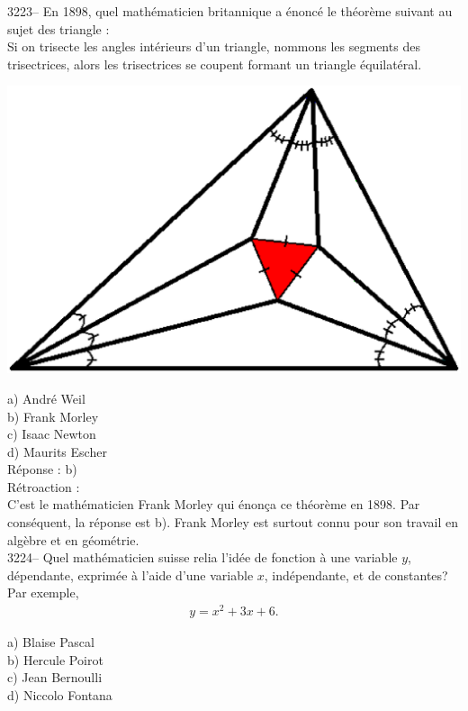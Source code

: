 \documentclass[letterpaper, 12pt]{article}
\begin{document}
3223-- En 1898, quel math\'ematicien britannique a \'enonc\'e le th\'eor\`eme suivant au sujet des triangle :\\[2mm]
\og Si on trisecte les angles int\'erieurs d'un triangle, nommons les segments des trisectrices, alors les trisectrices se coupent formant un triangle \'equilat\'eral.\fg
\begin{center}
\includegraphics[scale=0.3]{thmMorley.eps}\\[5mm]
\end{center}

a) Andr\'e Weil\\
b) Frank Morley\\
c) Isaac Newton\\
d) Maurits Escher\\

R\'eponse : b)\\

R\'etroaction :\\
C'est le math\'ematicien Frank Morley qui \'enon\c ca ce th\'eor\`eme en 1898. Par cons\'equent, la r\'eponse est b). Frank Morley est surtout connu pour son travail en alg\`ebre et en g\'eom\'etrie.\\



3224-- Quel math\'ematicien suisse relia l'id\'ee de fonction \`a une variable $y$, d\'ependante, exprim\'ee \`a l'aide d'une variable $x$, ind\'ependante, et de constantes? Par exemple,
\begin{eqnarray*}
y = x^{2} + 3x + 6.
\end{eqnarray*}

a) Blaise Pascal\\
b) Hercule Poirot\\
c) Jean Bernoulli\\
d) Niccolo Fontana\\
\end{document}
